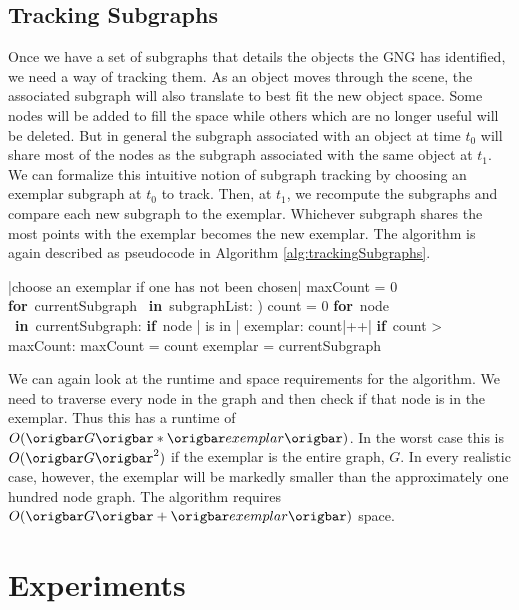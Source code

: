 \documentclass{article}
\renewcommand{\|}{\origbar} %
\renewcommand{\FOR}{\mbox{{\bf for} }\tab}
\renewcommand{\IF}{\mbox{{\bf if} }\tab}
\newcommand{\IN}{\mbox{ {\bf in} }}
\begin{document}
\subsection{Tracking Subgraphs}

Once we have a set of subgraphs that details the objects the GNG has identified, we need a way of tracking them. As an object moves through the scene, the associated subgraph will also translate to best fit the new object space. Some nodes will be added to fill the space while others which are no longer useful will be deleted. But in general the subgraph associated with an object at time $t_0$ will share most of the nodes as the subgraph associated with the same object at $t_1$. We can formalize this intuitive notion of subgraph tracking by choosing an exemplar subgraph at $t_0$ to track. Then, at $t_1$, we recompute the subgraphs and compare each new subgraph to the exemplar. Whichever subgraph shares the most points with the exemplar becomes the new exemplar. The algorithm is again described as pseudocode in Algorithm \ref{alg:trackingSubgraphs}.

\begin{Algorithm}[h!]
\begin{program}
  |choose an exemplar if one has not been chosen|
  maxCount = 0
  \FOR currentSubgraph \IN subgraphList: )
    count = 0
    \FOR node \IN currentSubgraph:
      \IF node | is in | exemplar:
        count|++| \untab \untab
    \IF count > maxCount:
      maxCount = count
      exemplar = currentSubgraph
\end{program}
\caption{Pseudocode for Tracking Subgraphs}
\label{alg:trackingSubgraphs}
\end{Algorithm}

We can again look at the runtime and space requirements for the algorithm. We need to traverse every node in the graph and then check if that node is in the exemplar. Thus this has a runtime of $O(\|G\|*\|exemplar\|)$. In the worst case this is $O(\|G\|^2)$ if the exemplar is the entire graph, $G$. In every realistic case, however, the exemplar will be markedly smaller than the approximately one hundred node graph. The algorithm requires $O(\|G\|+\|exemplar\|)$ space.

\section{Experiments}
\label{sec:experiments}
\end{document}
